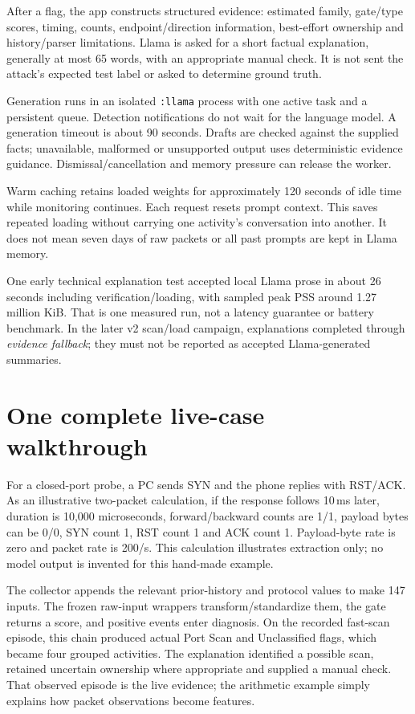 \documentclass[11pt,a4paper,oneside]{report}
\newcommand{\code}[1]{\nolinkurl{#1}}
\begin{document}
After a flag, the app constructs structured evidence: estimated family, gate/type scores, timing, counts, endpoint/direction information, best-effort ownership and history/parser limitations. Llama is asked for a short factual explanation, generally at most 65 words, with an appropriate manual check. It is not sent the attack's expected test label or asked to determine ground truth.

Generation runs in an isolated \code{:llama} process with one active task and a persistent queue. Detection notifications do not wait for the language model. A generation timeout is about 90 seconds. Drafts are checked against the supplied facts; unavailable, malformed or unsupported output uses deterministic evidence guidance. Dismissal/cancellation and memory pressure can release the worker.

Warm caching retains loaded weights for approximately 120 seconds of idle time while monitoring continues. Each request resets prompt context. This saves repeated loading without carrying one activity's conversation into another. It does not mean seven days of raw packets or all past prompts are kept in Llama memory.

One early technical explanation test accepted local Llama prose in about 26 seconds including verification/loading, with sampled peak PSS around 1.27 million KiB. That is one measured run, not a latency guarantee or battery benchmark. In the later v2 scan/load campaign, explanations completed through \emph{evidence fallback}; they must not be reported as accepted Llama-generated summaries.

\section{One complete live-case walkthrough}
For a closed-port probe, a PC sends SYN and the phone replies with RST/ACK. As an illustrative two-packet calculation, if the response follows 10\,ms later, duration is 10,000 microseconds, forward/backward counts are 1/1, payload bytes can be 0/0, SYN count 1, RST count 1 and ACK count 1. Payload-byte rate is zero and packet rate is 200/s. This calculation illustrates extraction only; no model output is invented for this hand-made example.

The collector appends the relevant prior-history and protocol values to make 147 inputs. The frozen raw-input wrappers transform/standardize them, the gate returns a score, and positive events enter diagnosis. On the recorded fast-scan episode, this chain produced actual Port Scan and Unclassified flags, which became four grouped activities. The explanation identified a possible scan, retained uncertain ownership where appropriate and supplied a manual check. That observed episode is the live evidence; the arithmetic example simply explains how packet observations become features.
\end{document}
